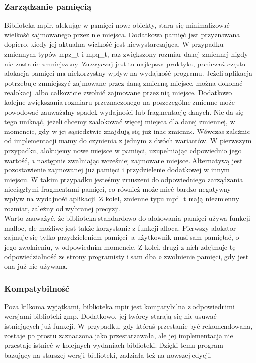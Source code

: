 \documentclass[oneside,a4paper]{book}
\begin{document}
	\subsubsection{Zarządzanie pamięcią}
	Biblioteka mpir, alokując w pamięci nowe obiekty, stara się minimalizować wielkość zajmowanego przez nie miejsca. Dodatkowa pamięć jest przyznawana dopiero, kiedy jej aktualna wielkość jest niewystarczająca. W przypadku zmiennych typów mpz\_t i mpq\_t, raz zwiększony rozmiar danej zmiennej nigdy nie zostanie zmniejszony. Zazwyczaj jest to najlepsza praktyka, ponieważ częsta alokacja pamięci ma niekorzystny wpływ na wydajność programu. Jeżeli aplikacja potrzebuje zmniejszyć zajmowane przez daną zmienną miejsce, można dokonać realokacji albo całkowicie zwolnić zajmowane przez nią miejsce. Dodatkowo kolejne zwiększania rozmiaru przeznaczonego na poszczególne zmienne może powodować zauważalny spadek wydajności lub fragmentację danych. Nie da się tego uniknąć, jeżeli chcemy zaalokować więcej miejsca dla danej zmiennej, w momencie, gdy w jej sąsiedztwie znajdują się już inne zmienne. Wówczas zależnie od implementacji mamy do czynienia z jednym z dwóch wariantów. W pierwszym przypadku, alokujemy nowe miejsce w pamięci, uzupełniając odpowiednio jego wartość, a następnie zwalniając wcześniej zajmowane miejsce. Alternatywą jest pozostawienie zajmowanej już pamięci i przydzielenie dodatkowej w innym miejscu. W takim przypadku jesteśmy zmuszeni do odpowiedniego zarządzania nieciągłymi fragmentami pamięci, co również może mieć bardzo negatywny wpływ na wydajność aplikacji. Z kolei, zmienne typu mpf\_t mają niezmienny rozmiar, zależny od wybranej precyzji. \\
	Warto zauważyć, że biblioteka standardowo do alokowania pamięci używa funkcji malloc, ale możliwe jest także korzystanie z funkcji alloca. Pierwszy alokator zajmuje się tylko przydzieleniem pamięci, a użytkownik musi sam pamiętać, o jego zwolnieniu, w odpowiednim momencie. Z kolei, drugi z nich zdejmuje tę odpowiedzialność ze strony programisty i sam dba o zwolnienie pamięci, gdy jest ona już nie używana.
	
	\subsubsection{Kompatybilność}
	Poza kilkoma wyjątkami, biblioteka mpir jest kompatybilna z odpowiednimi wersjami biblioteki gmp. Dodatkowo, jej twórcy starają się nie usuwać istniejących już funkcji. W przypadku, gdy któraś przestanie być rekomendowana, zostaje po prostu zaznaczona jako przestarzawała, ale jej implementacja nie przestaje istnieć w kolejnych wydaniach biblioteki. Dzięki temu program, bazujący na starszej wersji biblioteki, zadziała też na nowszej edycji.
	
\end{document}
